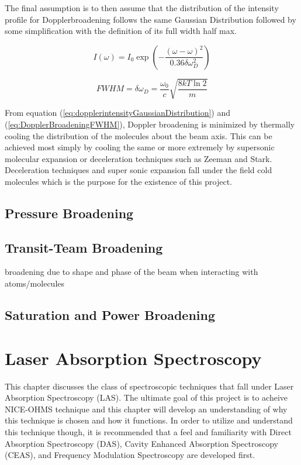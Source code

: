 \documentclass[a4paper]{book}
\begin{document}
The final assumption is to then assume that the distribution of the intensity profile for Dopplerbroadening follows the same Gaussian Distribution followed by some simplification with the definition of its full width half max.

\begin{equation}
\label{eq:dopplerintensityGaussianDistribution}
I(\omega)=I_0 \exp{\left(-\dfrac{(\omega-\omega)^2}{0.36 \delta \omega_{D}^2}\right)}
\end{equation}

\begin{equation}
\label{eq:DopplerBroadeningFWHM}
FWHM=\delta \omega_D =\dfrac{\omega_0}{c} \sqrt{\dfrac{8kT\ln{2}}{m}}
\end{equation}

From equation (\ref{eq:dopplerintensityGaussianDistribution}) and (\ref{eq:DopplerBroadeningFWHM}), Doppler broadening is minimized by thermally cooling the distribution of the molecules about the beam axis. This can be achieved most simply by cooling the same or more extremely by supersonic molecular expansion or deceleration techniques such as Zeeman and Stark. Deceleration techniques and super sonic expansion fall under the field cold molecules which is the purpose for the existence of this project.

\subsection{Pressure Broadening}

\subsection{Transit-Team Broadening}
broadening due to shape and phase of the beam when interacting with atoms/molecules

\subsection{Saturation and Power Broadening}
\section{Laser Absorption Spectroscopy}
\label{sec:Laser Absorption Spectroscopy}
This chapter discusses the class of spectroscopic techniques that fall under Laser Absorption Spectroscopy (LAS). The ultimate goal of this project is to acheive NICE-OHMS technique and this chapter will develop an understanding of why this technique is chosen and how it functions. In order to utilize and understand this technique though, it is recommended that a feel and familiarity with Direct Absorption Spectroscopy (DAS), Cavity Enhanced Absorption Spectroscopy (CEAS), and Frequency Modulation Spectroscopy are developed first.	
\end{document}
